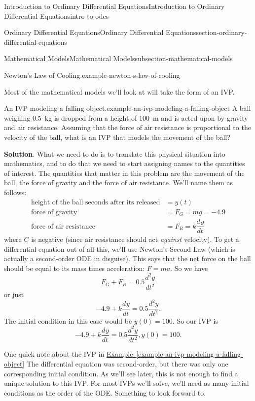 \documentclass[oneside,10pt,]{book}
\numberwithin{equation}{section}
\newcommand{\dv}[3][]{\dfrac{d^{#1} #2}{d #3^{#1}}}
\begin{document}
\begin{chapterptx}{Introduction to Ordinary Differential Equations}{}{Introduction to Ordinary Differential Equations}{}{}{intro-to-odes}
\begin{sectionptx}{Ordinary Differential Equations}{}{Ordinary Differential Equations}{}{}{section-ordinary-differential-equations}
\begin{subsectionptx}{Mathematical Models}{}{Mathematical Models}{}{}{subsection-mathematical-models}
\begin{example}{Newton's Law of Cooling.}{example-newton-s-law-of-cooling}
\end{example}
\hypertarget{p-30}{}%
Most of the mathematical models we'll look at will take the form of an IVP.%
\begin{example}{An IVP modeling a falling object.}{example-an-ivp-modeling-a-falling-object}%
\hypertarget{p-31}{}%
A ball weighing \SI{0.5}{\kilo\gram} is dropped from a height of \SI{100}{\meter} and is acted upon by gravity and air resistance. Assuming that the force of air resistance is proportional to the velocity of the ball, what is an IVP that models the movement of the ball?%
\par\smallskip%
\noindent\textbf{Solution}.\hypertarget{solution-5}{}\quad%
\hypertarget{p-32}{}%
What we need to do is to translate this physical situation into mathematics, and to do that we need to start assigning names to the quantities of interest. The quantities that matter in this problem are the movement of the ball, the force of gravity and the force of air resistance. We'll name them as follows:%
\begin{align*}
\text{height of the ball  seconds after its released} &= y(t) \\
\text{force of gravity} &= F_{G} = mg = -4.9\\
\text{force of air resistance} &= F_{R} = k\dv{y}{t} 
\end{align*}
where \(C\) is negative (since air resistance should act \emph{against} velocity). To get a differential equation out of all this, we'll use Newton's Second Law (which is actually a second-order ODE in disguise). This says that the net force on the ball should be equal to its mass times acceleration: \(F = ma\). So we have%
\begin{equation*}
F_{G}+F_{R} = 0.5\dv[2]{y}{t}
\end{equation*}
or just%
\begin{equation*}
-4.9+k\dv{y}{t} = 0.5\dv[2]{y}{t}.
\end{equation*}
The initial condition in this case would be \(y(0) = 100\). So our IVP is%
\begin{equation*}
-4.9+k\dv{y}{t} = 0.5\dv[2]{y}{t}, y(0) = 100.
\end{equation*}
%
\end{example}
\hypertarget{p-33}{}%
One quick note about the IVP in \hyperref[example-an-ivp-modeling-a-falling-object]{Example~\ref{example-an-ivp-modeling-a-falling-object}} The differential equation was second-order, but there was only one corresponding initial condition. As we'll see later, this is not enough to find a unique solution to this IVP. For most IVPs we'll solve, we'll need as many initial conditions as the order of the ODE. Something to look forward to.%

\end{subsectionptx}
\end{sectionptx}
\end{chapterptx}
\end{document}
